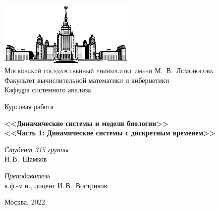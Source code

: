 \documentclass[11pt]{article}
\begin{document}
\thispagestyle{empty}

\begin{center}
\ \vspace{-3cm}

\includegraphics[width=0.5\textwidth]{msu.eps}\\
{\scshape Московский государственный университет имени М.~В.~Ломоносова}\\
Факультет вычислительной математики и кибернетики\\
Кафедра системного анализа

\vfill

{\LARGE Курсовая работа}

\vspace{1cm}

{\LARGE\bfseries <<Динамические системы и модели биологии>>} \\
\vspace{1cm}
{\Large\bfseries <<Часть 1: Динамические системы с дискретным временем>>}
\end{center}

\vspace{1cm}

\begin{flushright}
  \large
  \textit{Студент 315 группы}\\
  И.\,В.~Шамков

  \vspace{5mm}

  \textit{Преподаватель}\\
  к.ф.-м.н., доцент И.\,В.~Востриков
\end{flushright}

\vfill

\begin{center}
Москва, 2022
\end{center}

\newpage
\tableofcontents
\newpage
\end{document}
